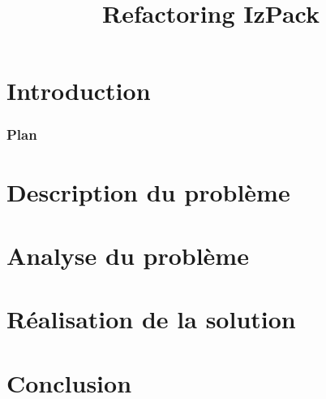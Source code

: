 \documentclass[slidetop,11pt]{beamer}
\title{Refactoring IzPack}
\date{\oldstylenums{\today}}
\begin{document}

\section*{Introduction}

\begin{frame}\frametitle{Plan}
\tableofcontents
\end{frame}
\section{Description du problème}

\section{Analyse du problème}

\section{Réalisation de la solution}

\section*{Conclusion}

\end{document}
